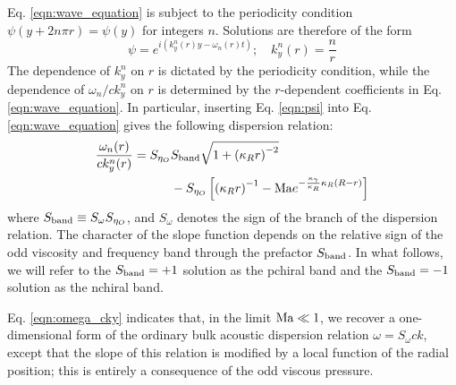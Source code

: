 \documentclass[%
 reprint,
superscriptaddress,
longbibliography,
 amsmath,amssymb,
 prl,
 citeautoscript,
]{revtex4-1}
\begin{document}
Eq. \ref{eqn:wave_equation} is subject to the periodicity condition $\psi \left( y + 2 n \pi r \right) = \psi \left( y \right)$ for integers $n$. Solutions are therefore of the form
\begin{equation}
\psi = e^{i \left( k_y^n (r) y - \omega_n (r) t \right)}; \quad k_y^n (r) = \frac{n}{r}
\label{eqn:psi}
\end{equation}
The dependence of $k_y^n$ on $r$ is dictated by the periodicity condition, while the dependence of $\omega_n / c k_y^n$ on $r$ is determined by the $r$-dependent coefficients in Eq. \ref{eqn:wave_equation}. In particular, inserting Eq. \ref{eqn:psi} into Eq. \ref{eqn:wave_equation} gives the following dispersion relation:
\begin{equation}
\begin{split}
\frac{\omega_n (r)}{c k_y^n (r)} &= S_{\eta_O} S_{\rm band} \sqrt{1 + \left( \kappa_R r \right)^{-2}} \\
&\quad \quad \quad- S_{\eta_O} \left[ \left( \kappa_R r \right)^{-1} - {\rm Ma} e^{- \frac{\kappa_{\gamma}}{\kappa_R} \kappa_R \left( R - r \right)} \right]
\end{split}
\label{eqn:omega_cky}
\end{equation}
where $S_{\rm band} \equiv S_{\omega} S_{\eta_O}$, and $S_{\omega}$ denotes the sign of the branch of the dispersion relation. The character of the slope function depends on the relative sign of the odd viscosity and frequency band through the prefactor $S_{\rm band}$. In what follows, we will refer to the $S_{\rm band} = +1$ solution as the pchiral band and the $S_{\rm band} = -1$ solution as the nchiral band. 

Eq. \ref{eqn:omega_cky} indicates that, in the limit ${\rm Ma} \ll 1$, we recover a one-dimensional form of the ordinary bulk acoustic dispersion relation $\omega = S_{\omega} c k$, except that the slope of this relation is modified by a local function of the radial position; this is entirely a consequence of the odd viscous pressure.
\end{document}
